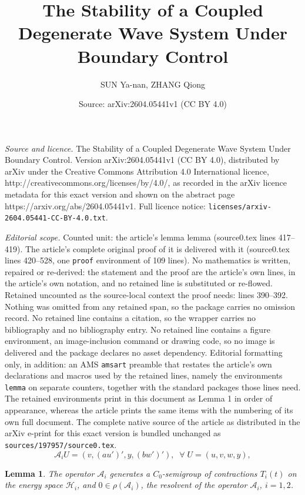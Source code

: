 \documentclass[10pt,a4paper]{amsart}
\title{The Stability of a Coupled Degenerate Wave System Under Boundary Control}
\author{SUN Ya-nan, ZHANG Qiong}
\date{Source: arXiv:2604.05441v1 (CC BY 4.0)}
\newtheorem{lemma}{Lemma}
\begin{document}
\maketitle

\noindent\emph{Source and licence.} The Stability of a Coupled Degenerate Wave System Under Boundary Control. Version arXiv:2604.05441v1 (CC BY 4.0), distributed by arXiv under the Creative Commons Attribution 4.0 International licence, http://creativecommons.org/licenses/by/4.0/, as recorded in the arXiv licence metadata for this exact version and shown on the abstract page https://arxiv.org/abs/2604.05441v1. Full licence notice: \texttt{licenses/arxiv-2604.05441-CC-BY-4.0.txt}.\par\smallskip

\noindent\textit{Editorial scope.} Counted unit: the article's lemma lemma (source0.tex lines 417--419). The article's complete original proof of it is delivered with it (source0.tex lines 420--528, one \texttt{proof} environment of 109 lines). No mathematics is written, repaired or re-derived: the statement and the proof are the article's own lines, in the article's own notation, and no retained line is substituted or re-flowed.  Retained uncounted as the source-local context the proof needs: lines 390--392.  Nothing was omitted from any retained span, so the package carries no omission record.  No retained line contains a citation, so the wrapper carries no bibliography and no bibliography entry.  No retained line contains a figure environment, an image-inclusion command or drawing code, so no image is delivered and the package declares no asset dependency.  Editorial formatting only, in addition: an AMS \texttt{amsart} preamble that restates the article's own declarations and macros used by the retained lines, namely the environments \texttt{lemma} on separate counters, together with the standard packages those lines need.  The retained environments print in this document as Lemma 1 in order of appearance, whereas the article prints the same items with the numbering of its own full document.  The complete native source of the article as distributed in the arXiv e-print for this exact version is bundled unchanged as \texttt{sources/197957/source0.tex}.
\begin{equation}\label{def}
\mathcal A_i U = (v,(au')',y,(bw')'),\;\;\forall\;U = (u,v,w,y),
\end{equation}

\begin{lemma}
The operator $\mathcal A_i$ generates a $C_0$-semigroup of contractions $T_i(t)$ on the energy space $\mathcal H_i$, and $0\in\rho(\mathcal A_i)$, the resolvent of the operator $\mathcal A_i$, $i=1,2$.
\end{lemma}
\end{document}
